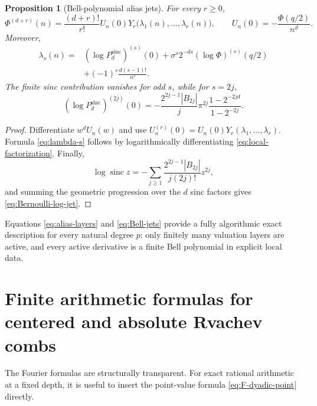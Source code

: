 \documentclass[11pt]{article}
\newtheorem{proposition}[theorem]{Proposition}
\theoremstyle{definition}
\DeclareMathOperator{\sinc}{sinc}
\begin{document}
\begin{proposition}[Bell-polynomial alias jets]
\label{prop:Bell-jets}
For every $r\ge0$,
\begin{equation}
 \Phi^{(d+r)}(n)
 =\frac{(d+r)!}{r!}U_n(0)
 Y_r\bigl(\lambda_1(n),\dots,\lambda_r(n)\bigr),
 \qquad
 U_n(0)=-\frac{\Phi(q/2)}{n^d}.
 \label{eq:Bell-jets}
\end{equation}
Moreover,
\begin{equation}
\begin{split}
 \lambda_s(n)={}&
 \left(\log P_d^{\mathrm{sinc}}\right)^{(s)}(0)
 +\sigma^s2^{-ds}
 \left(\log\Phi\right)^{(s)}(q/2)\\
 &+(-1)^s\frac{d(s-1)!}{n^s}.
\end{split}
\label{eq:lambda-s}
\end{equation}
The finite sinc contribution vanishes for odd $s$, while for $s=2j$,
\begin{equation}
 \left(\log P_d^{\mathrm{sinc}}\right)^{(2j)}(0)
 =-\frac{2^{2j-1}|B_{2j}|}{j}\pi^{2j}
 \frac{1-2^{-2jd}}{1-2^{-2j}}.
 \label{eq:Bernoulli-log-jet}
\end{equation}
\end{proposition}

\begin{proof}
Differentiate $w^dU_n(w)$ and use
$U_n^{(r)}(0)=U_n(0)Y_r(\lambda_1,\dots,\lambda_r)$.  Formula
\eqref{eq:lambda-s} follows by logarithmically differentiating
\eqref{eq:local-factorization}.  Finally,
\[
 \log\sinc z
 =-\sum_{j\ge1}\frac{2^{2j-1}|B_{2j}|}{j(2j)!}z^{2j},
\]
and summing the geometric progression over the $d$ sinc factors gives
\eqref{eq:Bernoulli-log-jet}.
\end{proof}

Equations \eqref{eq:alias-layers} and \eqref{eq:Bell-jets} provide a fully
algorithmic exact description for every natural degree $p$: only finitely
many valuation layers are active, and every active derivative is a finite
Bell polynomial in explicit local data.

\section{Finite arithmetic formulas for centered and absolute Rvachev combs}
\label{sec:finite-arithmetic}

The Fourier formulas are structurally transparent.  For exact rational
arithmetic at a fixed depth, it is useful to insert the point-value formula
\eqref{eq:F-dyadic-point} directly.
\end{document}
